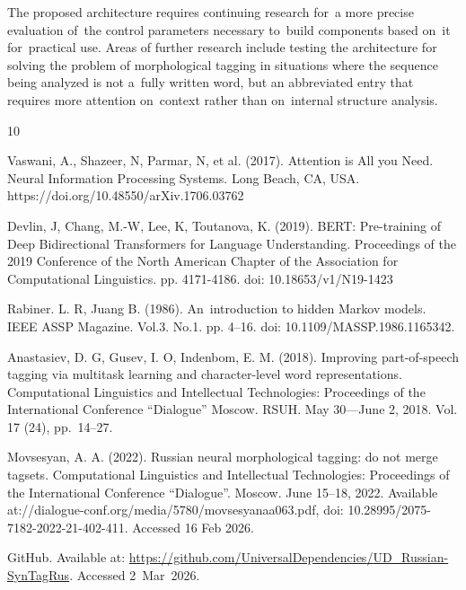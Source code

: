 \documentclass[11pt,twocolumn]{article}
\begin{document}
The proposed architecture requires continuing research for~a more precise evaluation of~the control parameters
necessary to~build components based on~it for~practical use.
Areas of further research include testing the architecture for solving the problem of morphological tagging in situations
where the sequence being analyzed is not a~fully written word, but an abbreviated entry
that requires more attention on~context rather than on~internal structure analysis.

\onecolumn %
\begin{thebibliography}{10}

  Vaswani, A., Shazeer, N, Parmar, N, et al. (2017). Attention is All you Need. Neural Information Processing Systems. Long Beach, CA, USA.  https://doi.org{\slash}10.48550{\slash}arXiv.1706.03762

Devlin, J,  Chang, M.-W, Lee, K, Toutanova, K. (2019). BERT: Pre-training of Deep Bidirectional Transformers for Language Understanding. Proceedings of the 2019 Conference of the North American Chapter of the Association for Computational Linguistics. pp. 4171-4186. doi: 10.18653/v1{\slash}N19-1423
  
  Rabiner. L. R, Juang B. (1986).
  An~introduction to hidden Markov models. IEEE ASSP Magazine. Vol.3. No.1. pp. 4--16. doi: 10.1109{\slash}MASSP.1986.1165342.

  
  
  Anastasiev, D. G, Gusev, I. O, Indenbom, E. M. (2018).
  Improving part-of-speech tagging via multitask learning and character-level word representations.
  Computational Linguistics and Intellectual Technologies:
  Proceedings of the International Conference ``Dialogue'' Moscow. RSUH. May 30---June 2, 2018.
  Vol. 17 (24), pp.~14--27.

  
  
  Movsesyan, A. A. (2022).
  Russian neural morphological tagging: do not merge tagsets.
  Computational Linguistics and Intellectual Technologies:
  Proceedings of the International Conference ``Dialogue''. Moscow. June 15--18, 2022. Available at://dialogue-conf.org/media/5780/movsesyanaa063.pdf, doi: 10.28995{\slash}2075-7182-2022-21-402-411.
  Accessed 16 Feb 2026.

  GitHub. Available at: \href{https://github.com/UniversalDependencies/UD\_Russian-SynTagRus}{https://github.com{\slash}UniversalDependencies{\slash}UD\_Russian-SynTagRus}.
  Accessed 2~Mar~2026.


\end{thebibliography}
\end{document}
